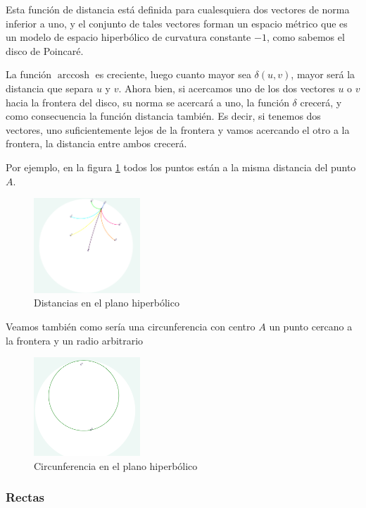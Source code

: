 \documentclass{article}
\theoremstyle{plain}
\theoremstyle{definition}
\theoremstyle{remark}
\begin{document}
Esta función de distancia está definida para cualesquiera dos vectores
de norma inferior a uno, y el conjunto de tales vectores forman un
espacio métrico que es un modelo de espacio hiperbólico de curvatura
constante $-1$, como sabemos el disco de Poincaré.

La función $\operatorname{arccosh}$ es creciente, luego cuanto mayor
sea $\delta(u,v)$, mayor será la distancia que separa $u$ y $v$. Ahora
bien, si acercamos uno de los dos vectores $u$ o $v$ hacia la frontera
del disco, su norma se acercará a uno, la función $\delta$ crecerá, y
como consecuencia la función distancia también. Es decir, si tenemos
dos vectores, uno suficientemente lejos de la frontera y vamos
acercando el otro a la frontera, la distancia entre ambos crecerá.

Por ejemplo, en la figura \ref{distances} todos los puntos están a la misma
distancia del punto $A$.

\begin{figure}[ht!]
  \centering
  \includegraphics[width=40mm]{./Distancias.png}
  \caption{Distancias en el plano hiperbólico\label{distances}}
\end{figure}

Veamos también como sería una circunferencia con centro $A$ un punto
cercano a la frontera y un radio arbitrario

\begin{figure}[ht!]
  \centering
  \includegraphics[width=40mm]{./Circunferencia.png}
  \caption{Circunferencia en el plano hiperbólico\label{circunferencia}}
\end{figure}


\subsubsection{Rectas}
\end{document}
